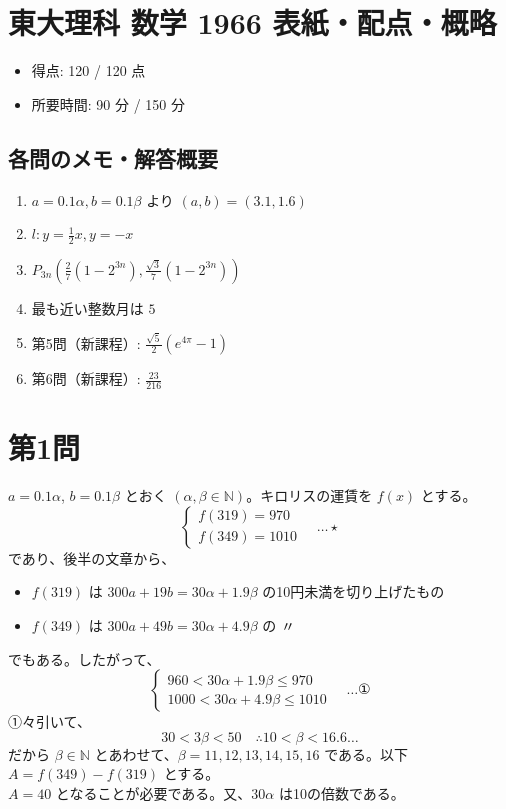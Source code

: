\documentclass[../main.tex]{subfiles}
\begin{document}
\section*{東大理科 数学 1966 表紙・配点・概略}

\begin{itemize}
  \item 得点: 120 / 120 点
  \item 所要時間: 90 分 / 150 分
\end{itemize}

\subsection*{各問のメモ・解答概要}
\begin{enumerate}
  \item $a = 0.1\alpha, b = 0.1\beta$ より $(a, b) = (3.1, 1.6)$
  \item $l: y = \frac{1}{2}x, y = -x$
  \item $P_{3n}\left(\frac{2}{7}(1-2^{3n}), \frac{\sqrt{3}}{7}(1-2^{3n})\right)$
  \item 最も近い整数月は $5$
  \item 第5問（新課程）: $\frac{\sqrt{5}}{2}(e^{4\pi}-1)$
  \item 第6問（新課程）: $\frac{23}{216}$
\end{enumerate}

\newpage

\section*{第1問}

\noindent
[\textbf{解}] $a = 0.1\alpha$, $b = 0.1\beta$ とおく $(\alpha, \beta \in \mathbb{N})$。キロリスの運賃を $f(x)$ とする。
\[
  \begin{cases}
    f(319) = 970 \\
    f(349) = 1010
  \end{cases}
  \quad \dots \star
\]
であり、後半の文章から、
\begin{itemize}
  \item $f(319)$ は $300a + 19b = 30\alpha + 1.9\beta$ の10円未満を切り上げたもの
  \item $f(349)$ は $300a + 49b = 30\alpha + 4.9\beta$ の 〃
\end{itemize}
でもある。したがって、
\[
  \begin{cases}
    960 < 30\alpha + 1.9\beta \le 970 \\
    1000 < 30\alpha + 4.9\beta \le 1010
  \end{cases}
  \quad \dots \text{①}
\]
①々引いて、
\[
  30 < 3\beta < 50 \quad \therefore 10 < \beta < 16.6\dots
\]
だから $\beta \in \mathbb{N}$ とあわせて、$\beta = 11, 12, 13, 14, 15, 16$ である。以下 $A = f(349) - f(319)$ とする。\\
$A = 40$ となることが必要である。又、$30\alpha$ は10の倍数である。
\end{document}
